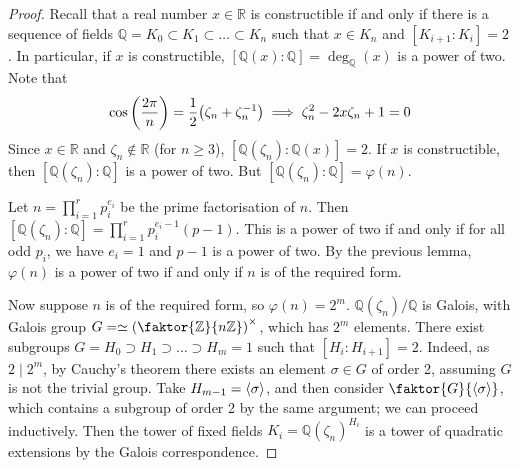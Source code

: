 \begin{proof}
	Recall that a real number \( x \in \mathbb R \) is constructible if and only if there is a sequence of fields \( \mathbb Q = K_0 \subset K_1 \subset \dots \subset K_n \) such that \( x \in K_n \) and \( [K_{i+1} : K_i] = 2 \).
	In particular, if \( x \) is constructible, \( [\mathbb Q(x) : \mathbb Q] = \deg_{\mathbb Q}(x) \) is a power of two.
	Note that
	\[ \cos\qty(\frac{2\pi}{n}) = \frac{1}{2} \qty(\zeta_n + \zeta_n^{-1}) \implies \zeta_n^2 - 2x\zeta_n + 1 = 0 \]
	Since \( x \in \mathbb R \) and \( \zeta_n \not\in \mathbb R \) (for \( n \geq 3 \)), \( [\mathbb Q(\zeta_n) : \mathbb Q(x)] = 2 \).
	If \( x \) is constructible, then \( [\mathbb Q(\zeta_n):\mathbb Q] \) is a power of two.
	But \( [\mathbb Q(\zeta_n):\mathbb Q] = \varphi(n) \).

	Let \( n = \prod_{i=1}^r p_i^{e_i} \) be the prime factorisation of \( n \).
	Then \( [\mathbb Q(\zeta_n):\mathbb Q] = \prod_{i=1}^r p_i^{e_i - 1}(p-1) \).
	This is a power of two if and only if for all odd \( p_i \), we have \( e_i = 1 \) and \( p - 1 \) is a power of two.
	By the previous lemma, \( \varphi(n) \) is a power of two if and only if \( n \) is of the required form.

	Now suppose \( n \) is of the required form, so \( \varphi(n) = 2^m \).
	\( \mathbb Q(\zeta_n) / \mathbb Q \) is Galois, with Galois group \( G = \simeq \qty(\faktor{\mathbb Z}{n\mathbb Z})^\times \), which has \( 2^m \) elements.
	There exist subgroups \( G = H_0 \supset H_1 \supset \dots \supset H_m = 1 \) such that \( [H_i : H_{i+1}] = 2 \).
	Indeed, as \( 2 \mid 2^m \), by Cauchy's theorem there exists an element \( \sigma \in G \) of order 2, assuming \( G \) is not the trivial group.
	Take \( H_{m-1} = \left\langle{} \sigma \right\rangle \), and then consider \( \faktor{G}{\genset{\sigma}} \), which contains a subgroup of order 2 by the same argument; we can proceed inductively.
	Then the tower of fixed fields \( K_i = \mathbb Q(\zeta_n)^{H_i} \) is a tower of quadratic extensions by the Galois correspondence.
\end{proof}

